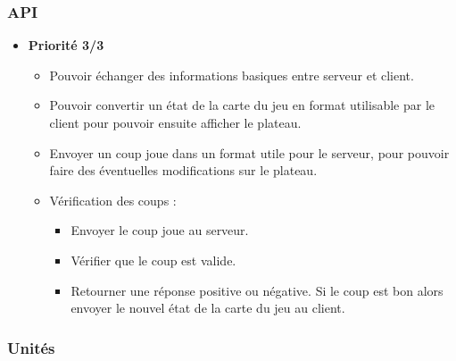 \subsubsection{API}
\begin{itemize}
    \item \textbf{Priorité 3/3}
    \begin{itemize}
        \item Pouvoir échanger des informations basiques entre serveur et client.\cmark
        \item Pouvoir convertir un état de la carte du jeu en format utilisable par le client pour pouvoir ensuite afficher le plateau.
        \item Envoyer un coup joue dans un format utile pour le serveur, pour pouvoir faire des éventuelles modifications sur le plateau.\cmark
        \item Vérification des coups :
        \begin{itemize}
            \item Envoyer le coup joue au serveur.\cmark
            \item Vérifier que le coup est valide.\cmark
            \item Retourner une réponse positive ou négative. Si le coup est bon alors envoyer le nouvel état de la carte du jeu au client.\cmark
        \end{itemize}
    \end{itemize}
\end{itemize}

\subsubsection{Unités}


